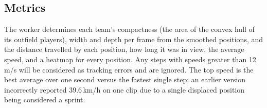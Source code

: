 \subsection{Metrics}
\label{sec:metrics}

The worker determines each team’s compactness (the area of the convex hull of its outfield players), width and depth per frame from the smoothed positions, and the distance travelled by each position, how long it was in view, the average speed, and a heatmap for every position. Any steps with speeds greater than 12\,m/s will be considered as tracking errors and are ignored. The top speed is the best average over one second versus the fastest single step; an earlier version incorrectly reported 39.6\,km/h on one clip due to a single displaced position being considered a sprint.
